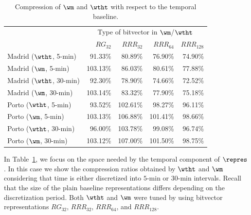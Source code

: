 \begin{table}[htb]
\begin{center}
\scriptsize
\setlength\tabcolsep{2pt}
  \begin{tabular}{|l|*{4}{r}|}
  \cline{2-5}
  \multicolumn{1}{c|}{} & \multicolumn{4}{c|}{Type of bitvector in $\wm$/$\wtht$}\\

  \multicolumn{1}{c|}{}   & $RG_{32}$& $RRR_{32}$& $RRR_{64}$& $RRR_{128}$\\
  \hline                                             
  Madrid ($\wtht$, 5-min) &  91.33\% &	 80.89\% &	 76.90\% & 	 74.90\% \\
  Madrid ($\wm$, 5-min)   & 103.13\% &	 86.03\% &	 80.61\% & 	 77.88\% \\
  Madrid ($\wtht$, 30-min)&  92.30\% &	 78.90\% &	 74.66\% &	 72.52\% \\
  Madrid ($\wm$, 30-min)  & 103.14\% &	 83.32\% &	 77.90\% &	 75.18\% \\
  \hline                  
  Porto ($\wtht$, 5-min)  &  93.52\% &	102.61\% &	 98.27\% &	 96.11\% \\
  Porto ($\wm$, 5-min)    & 103.13\% &	106.88\% &	101.41\% &	 98.66\% \\
  Porto ($\wtht$, 30-min) &  96.00\% &	103.78\% &	 99.08\% &	 96.74\% \\
  Porto ($\wm$, 30-min)   & 103.12\% &	107.00\% &	101.50\% &	 98.75\% \\

  \hline
  \cline{2-5}
  \end{tabular}
\caption{Compression of $\wm$ and $\wtht$ with respect to the temporal baseline.}
\label{table:ctr_wt_spaces}
\vspace{-3mm}
\end{center}
\end{table}



In Table~\ref{table:ctr_wt_spaces}, we focus on the space needed by the temporal component of $\repres$. 
In this case we show the compression ratios obtained by $\wtht$ and $\wm$ %
considering that time is either discretized into $5$-min or $30$-min intervals. Recall that the size of the 
plain baseline representations differs depending on the discretization period. Both $\wtht$ and $\wm$ were tuned by
using bitvector representations $RG_{32}$, $RRR_{32}$, $RRR_{64}$, and $ RRR_{128}$.

